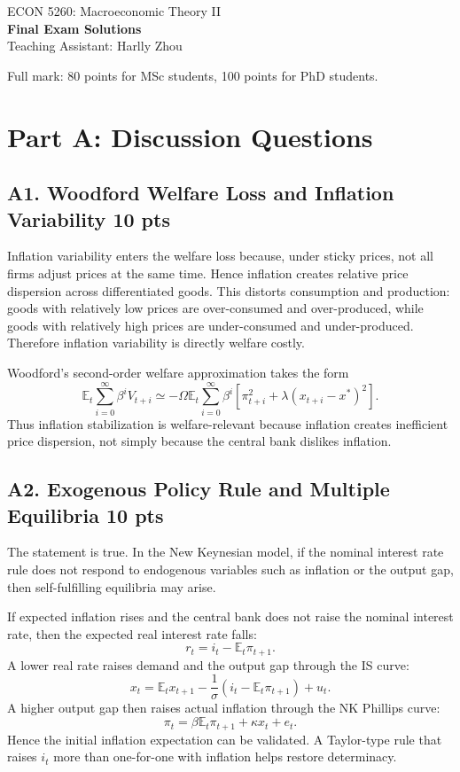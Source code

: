 \documentclass[11pt]{article}
\begin{document}
\begin{center}
    ECON 5260: Macroeconomic Theory II\\
    {\large \textbf{Final Exam Solutions}}\\
    Teaching Assistant: Harlly Zhou
\end{center}

\noindent Full mark: 80 points for MSc students, 100 points for PhD students.


\section*{Part A: Discussion Questions}

\subsection*{A1. Woodford Welfare Loss and Inflation Variability \hfill 10 pts}

Inflation variability enters the welfare loss because, under sticky prices, not all firms adjust prices at the same time. Hence inflation creates relative price dispersion across differentiated goods. This distorts consumption and production: goods with relatively low prices are over-consumed and over-produced, while goods with relatively high prices are under-consumed and under-produced. Therefore inflation variability is directly welfare costly.

Woodford's second-order welfare approximation takes the form
\[
\mathbb{E}_t\sum_{i=0}^{\infty}\beta^i V_{t+i}
\simeq
-\Omega \mathbb{E}_t\sum_{i=0}^{\infty}\beta^i
\left[
\pi_{t+i}^2+\lambda (x_{t+i}-x^*)^2
\right].
\]
Thus inflation stabilization is welfare-relevant because inflation creates inefficient price dispersion, not simply because the central bank dislikes inflation.

\clearpage
\subsection*{A2. Exogenous Policy Rule and Multiple Equilibria \hfill 10 pts}

The statement is true. In the New Keynesian model, if the nominal interest rate rule does not respond to endogenous variables such as inflation or the output gap, then self-fulfilling equilibria may arise.

If expected inflation rises and the central bank does not raise the nominal interest rate, then the expected real interest rate falls:
\[
r_t=i_t-\mathbb{E}_t\pi_{t+1}.
\]
A lower real rate raises demand and the output gap through the IS curve:
\[
x_t=\mathbb{E}_tx_{t+1}-\frac{1}{\sigma}(i_t-\mathbb{E}_t\pi_{t+1})+u_t.
\]
A higher output gap then raises actual inflation through the NK Phillips curve:
\[
\pi_t=\beta \mathbb{E}_t\pi_{t+1}+\kappa x_t+e_t.
\]
Hence the initial inflation expectation can be validated. A Taylor-type rule that raises \(i_t\) more than one-for-one with inflation helps restore determinacy.
\end{document}
